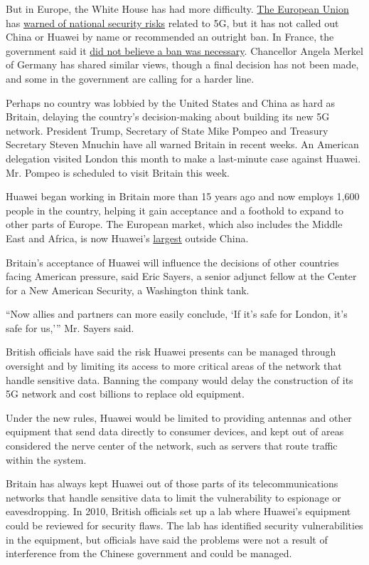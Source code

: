 But in Europe, the White House has had more difficulty.
\href{http://www.nytimes.com/2020/01/29/world/europe/eu-huawei-5g.html}{The
European Union} has
\href{https://www.nytimes.com/2019/10/09/world/europe/eu-huawei-report.html}{warned
of national security risks} related to 5G, but it has not called out
China or Huawei by name or recommended an outright ban. In France, the
government said it
\href{https://mobile.reuters.com/article/amp/idUSKBN1XZ1U9}{did not
believe a ban was necessary}. Chancellor Angela Merkel of Germany has
shared similar views, though a final decision has not been made, and
some in the government are calling for a harder line.

Perhaps no country was lobbied by the United States and China as hard as
Britain, delaying the country's decision-making about building its new
5G network. President Trump, Secretary of State Mike Pompeo and Treasury
Secretary Steven Mnuchin have all warned Britain in recent weeks. An
American delegation visited London this month to make a last-minute case
against Huawei. Mr. Pompeo is scheduled to visit Britain this week.

Huawei began working in Britain more than 15 years ago and now employs
1,600 people in the country, helping it gain acceptance and a foothold
to expand to other parts of Europe. The European market, which also
includes the Middle East and Africa, is now Huawei's
\href{https://www.huawei.com/uk/press-events/annual-report/2018}{largest}
outside China.

Britain's acceptance of Huawei will influence the decisions of other
countries facing American pressure, said Eric Sayers, a senior adjunct
fellow at the Center for a New American Security, a Washington think
tank.

``Now allies and partners can more easily conclude, `If it's safe for
London, it's safe for us,''' Mr. Sayers said.

British officials have said the risk Huawei presents can be managed
through oversight and by limiting its access to more critical areas of
the network that handle sensitive data. Banning the company would delay
the construction of its 5G network and cost billions to replace old
equipment.

Under the new rules, Huawei would be limited to providing antennas and
other equipment that send data directly to consumer devices, and kept
out of areas considered the nerve center of the network, such as servers
that route traffic within the system.

Britain has always kept Huawei out of those parts of its
telecommunications networks that handle sensitive data to limit the
vulnerability to espionage or eavesdropping. In 2010, British officials
set up a lab where Huawei's equipment could be reviewed for security
flaws. The lab has identified security vulnerabilities in the equipment,
but officials have said the problems were not a result of interference
from the Chinese government and could be managed.

